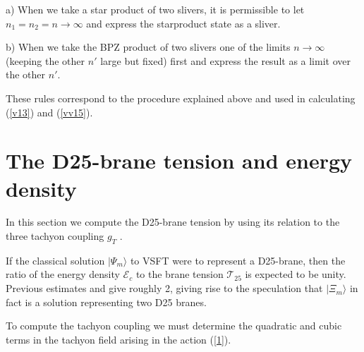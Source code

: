 \documentclass[a4paper,12pt]{article}
\begin{document}
a) When we take a star product of two slivers, it is permissible to
let $n_1=n_2=n\to\infty$ and express the starproduct state as a sliver.

b) When we take the BPZ product of two slivers one of the
limits $n\to\infty$ (keeping the other $n'$ large but fixed) first and
express the result as a limit over the other $n'$.

These rules  correspond to the procedure explained above and used in 
calculating (\ref{v13}) and (\ref{vv15}).

\vspace*{.8cm}

\section{The D25-brane tension and  energy density}

In this section we compute the D25-brane tension by using its relation
to the three tachyon coupling $g_T$ \cite{s,gs}.

If the classical solution $|\Psi_m\rangle$ to VSFT were to represent a
D25-brane, then the ratio of the energy density ${\mathcal E}_c$ to
the brane tension $\mathcal T_{25}$ is expected to be unity. Previous
estimates
\cite{rsz1} and \cite{hk,hm} give roughly 2, giving rise to the speculation
that
$|\Xi_m\rangle$ in fact is a solution representing two D25 branes.

To compute the tachyon coupling we must determine the quadratic and cubic
terms in the tachyon field arising in the action (\ref{1}).
\end{document}
